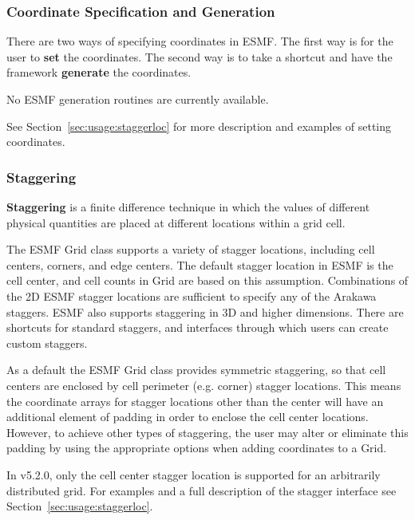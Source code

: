 \subsubsection{Coordinate Specification and Generation}

There are two ways of specifying coordinates in ESMF.  The
first way is for the user to {\bf set} the coordinates.  The second 
way is to take a shortcut and have the framework {\bf generate}
the coordinates.  

No ESMF generation routines are currently available.

See Section~\ref{sec:usage:staggerloc} for more description and examples of
setting coordinates.

\subsubsection{Staggering}

{\bf Staggering} is a finite difference technique in which the values 
of different physical quantities are placed at different locations
within a grid cell. 

The ESMF Grid class supports a variety of stagger locations, including
cell centers, corners, and edge centers. The default stagger location in 
ESMF is the cell center, and cell counts in Grid are based on this assumption.
Combinations of the 2D ESMF stagger locations are sufficient to specify any of the
Arakawa staggers.  ESMF also supports staggering in 3D and higher dimensions.
There are shortcuts for standard staggers, and interfaces through which users 
can create custom staggers.  

As a default the ESMF Grid class provides symmetric staggering, so
that cell centers are enclosed by cell perimeter (e.g. corner) 
stagger locations. This means the coordinate arrays for stagger
locations other than the center will have an additional element of 
padding in order to enclose the cell center locations.
However, to achieve other types of staggering, the user may alter 
or eliminate this padding by using the appropriate options when adding
coordinates to a Grid. 
 
In v5.2.0, only the cell center stagger location is supported for an
arbitrarily distributed grid. For examples and a full description of the stagger interface 
see Section~\ref{sec:usage:staggerloc}. 
